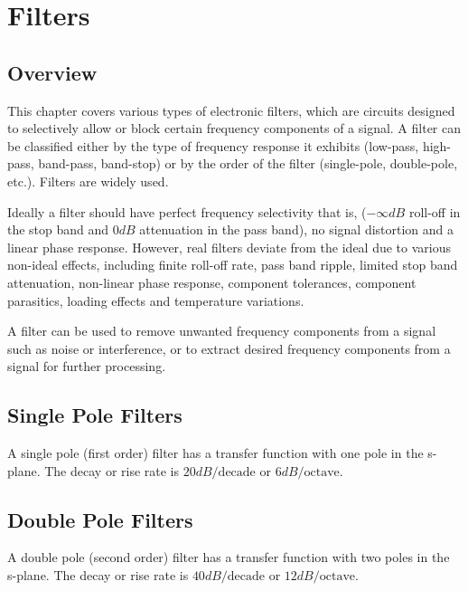 \chapter{Filters}

\section{Overview}
This chapter covers various types of electronic filters,
which are circuits designed to selectively allow or block
certain frequency components of a signal. A filter can
be classified either by the type of frequency response it
exhibits (low-pass, high-pass, band-pass, band-stop) or
by the order of the filter (single-pole, double-pole, etc.).
Filters are widely used.

Ideally a filter should have perfect frequency selectivity
that is, (\(-\infty dB\) roll-off in the stop band and \(0 dB\)
attenuation in the pass band), no signal distortion and a
linear phase response. However, real filters deviate from
the ideal due to various non-ideal effects, including finite
roll-off rate, pass band ripple, limited stop band
attenuation, non-linear phase response, component tolerances,
component parasitics, loading effects and temperature
variations.

A filter can be used to remove unwanted frequency components
from a signal such as noise or interference, or to extract
desired frequency components from a signal for further
processing.

\section{Single Pole Filters}
A single pole (first order) filter has a transfer function with
one pole in the s-plane. The decay or rise rate is \(20 dB/\text{decade}\)
or \(6 dB/\text{octave}\).




\section{Double Pole Filters}
A double pole (second order) filter has a transfer function with
two poles in the s-plane. The decay or rise rate is \(40 dB/\text{decade}\)
or \(12 dB/\text{octave}\).



